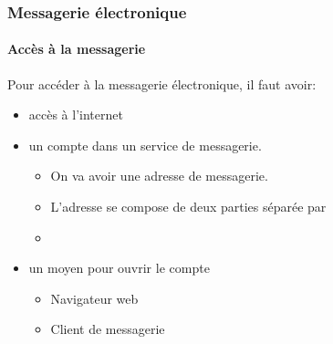 \documentclass[xcolor=table]{beamer}
\begin{document}
\begin{frame}
\frametitle{Messagerie électronique}
\framesubtitle{Accès à la messagerie}

Pour accéder à la messagerie électronique, il faut avoir:
\begin{itemize}
	\item accès à l'internet
	\item un compte dans un service de messagerie.  
	\begin{itemize}
		\item On va avoir une adresse de messagerie.
		\item L'adresse se compose de deux parties séparée par 
		\item {}
	\end{itemize}
	\item un moyen pour ouvrir le compte
	\begin{itemize}
		\item Navigateur web
		\item Client de messagerie 
	\end{itemize}
\end{itemize}

\end{frame}
\end{document}
